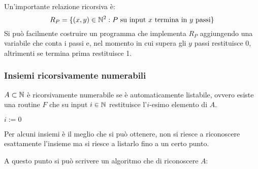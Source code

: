 Un'importante relazione ricorsiva è:
$$ R_P = \{(x,y)\in\mathbb{N}^2:\text{$P$ su input $x$ termina in $y$ passi}\} $$
Si può facilmente costruire un programma che implementa $R_P$ aggiungendo una variabile
che conta i passi e, nel momento in cui supera gli $y$ passi restituisce 0, altrimenti se
termina prima restituisce 1.

\subsubsection{Insiemi ricorsivamente numerabili}
$A\subset\mathbb{N}$ è ricorsivamente numerabile se è automaticamente listabile, ovvero esiste
una routine $F$ che su input $i\in\mathbb{N}$ restituisce l'$i$-esimo elemento di $A$.

\vspace{1em}
\hspace{2em}
\begin{minipage}{.32\textwidth}
    \begin{tcolorbox}[
        colback=white,
        sharp corners,
        boxrule=.3mm,
        left=20pt
    ]
    \begin{algorithm}[H]
        \SetAlgoNoEnd
        $i:=0$\;
    \end{algorithm}
    \end{tcolorbox}
\end{minipage}
\hspace{2em}
\begin{minipage}{.49\textwidth}
    Per alcuni insiemi è il meglio che si può ottenere, non si riesce a riconoscere
    esattamente l'insieme ma si riesce a listarlo fino a un certo punto.
\end{minipage}\vspace{1em}

A questo punto si può scrivere un algoritmo che  di riconoscere $A$:
\vspace{1em}

